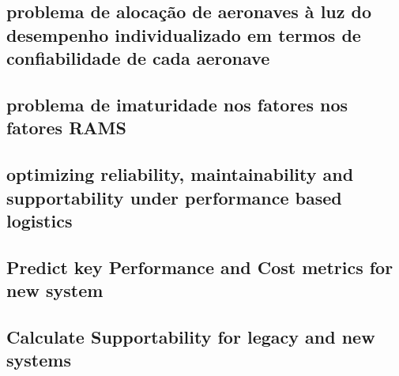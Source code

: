 \documentclass{amsart}
\begin{document}
\subsection{problema de alocação de aeronaves à luz do desempenho individualizado em termos de confiabilidade de cada aeronave}

\subsection{problema de imaturidade nos fatores nos fatores RAMS}

\subsection{optimizing reliability, maintainability and supportability under performance based logistics}

\subsection{Predict key Performance and Cost metrics for new system}

\subsection{Calculate Supportability for legacy and new systems}
\end{document}
